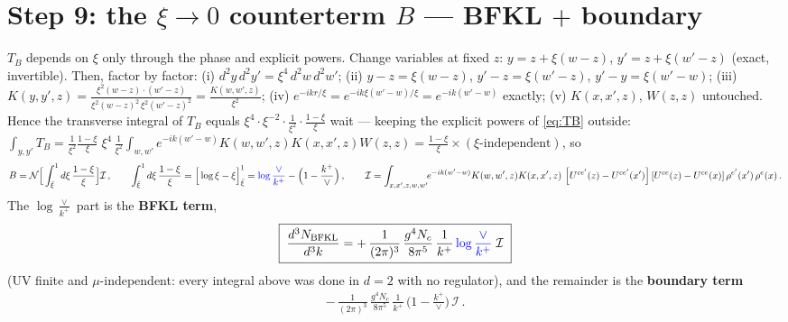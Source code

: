 \documentclass[9pt]{article}
\newcommand{\Wzz}{\left[U^{ce'}(z) - U^{ce'}(x')\right]\left[U^{ce}(z) - U^{ce}(x)\right]\rho^{e'}(x')\,\rho^{e}(x)}
\begin{document}
\section{Step 9: the $\xi\to0$ counterterm $B$ --- BFKL $+$ boundary}
$T_{B}$ depends on $\xi$ only through the phase and explicit powers. Change variables at
fixed $z$: $y=z+\xi(w-z)$, $y'=z+\xi(w'-z)$ (exact, invertible). Then, factor by factor:
(i) $d^{2}y\,d^{2}y'=\xi^{4}\,d^{2}w\,d^{2}w'$;
(ii) $y-z=\xi(w-z)$, $y'-z=\xi(w'-z)$, $y'-y=\xi(w'-w)$;
(iii) $K(y,y',z)=\frac{\xi^{2}(w-z)\cdot(w'-z)}{\xi^{2}(w-z)^{2}\,\xi^{2}(w'-z)^{2}}=\frac{K(w,w',z)}{\xi^{2}}$;
(iv) $e^{-ikr/\xi}=e^{-ik\xi(w'-w)/\xi}=e^{-ik(w'-w)}$ exactly;
(v) $K(x,x',z)$, $W(z,z)$ untouched. Hence the transverse integral of $T_{B}$ equals
$\xi^{4}\cdot\xi^{-2}\cdot\frac{1}{\xi^{2}}\cdot\frac{1-\xi}{\xi}$ wait --- keeping the
explicit powers of \eqref{eq:TB} outside: $\int_{y,y'}T_{B}
=\frac{1}{\xi^{2}}\frac{1-\xi}{\xi}\;\xi^{4}\,\frac{1}{\xi^{2}}\int_{w,w'}e^{-ik(w'-w)}K(w,w',z)K(x,x',z)W(z,z)
=\frac{1-\xi}{\xi}\times(\xi\text{-independent})$, so
\begin{align}
B=\mathcal N\Big[\int_{\bar\xi}^{1}d\xi\,\frac{1-\xi}{\xi}\Big]\mathcal I\,,\qquad
\int_{\bar\xi}^{1}d\xi\,\frac{1-\xi}{\xi}
=\Big[\log\xi-\xi\Big]_{\bar\xi}^{1}
={\color{blue}\log\frac{\vee}{k^{+}}}-\Big(1-\frac{k^{+}}{\vee}\Big)\,,\qquad
\mathcal I=\int_{x,x',z,w,w'}\!\!e^{-ik(w'-w)}K(w,w',z)K(x,x',z)\,\Wzz\,.
\end{align}
The $\log\frac{\vee}{k^{+}}$ part is the \textbf{BFKL term},
\begin{align}\label{eq:bfkl}
\boxed{\;\frac{d^{3}N_{\rm BFKL}}{d^{3}k}
=+\,\frac{1}{(2\pi)^{3}}\,\frac{g^{4}N_{c}}{8\pi^{5}}\,\frac{1}{k^{+}}\,{\color{blue}\log\frac{\vee}{k^{+}}}\;\mathcal I\;}
\end{align}
(UV finite and $\mu$-independent: every integral above was done in $d=2$ with no regulator),
and the remainder is the \textbf{boundary term}
\begin{align}\label{eq:boundary}
-\,\frac{1}{(2\pi)^{3}}\,\frac{g^{4}N_{c}}{8\pi^{5}}\,\frac{1}{k^{+}}\,\Big(1-\frac{k^{+}}{\vee}\Big)\,\mathcal I\,.
\end{align}
\end{document}
